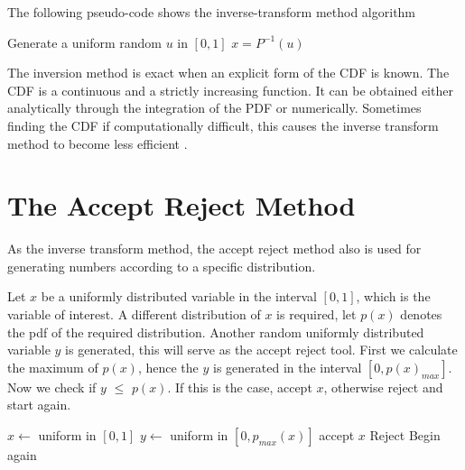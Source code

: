     
The following pseudo-code shows the inverse-transform method algorithm 
\begin{algorithmic}
\State Generate a uniform  random $u$ in $[0,1]$
\State \Return $x = P^{-1}(u)$
\end{algorithmic}

The inversion method is exact when an explicit form of the CDF is known. The CDF is a continuous and a strictly increasing function. It can be obtained either analytically through the integration of the PDF or numerically. Sometimes finding the CDF if computationally difficult, this causes the inverse transform method to become less efficient \citep{Devroye:1986:SNR:318242.318443}.

\section{The Accept Reject Method}
As the inverse transform method, the accept reject method also is used for generating numbers according to a specific distribution.

Let $x$ be a uniformly distributed variable in the interval $[0,1]$, which is the variable of interest. A different distribution of $x$ is required, let $p(x)$ denotes the pdf of the required distribution. Another  random uniformly distributed variable $y$ is generated, this will serve as the accept reject tool. First we calculate the maximum of $p(x)$, hence the $y$ is generated in the interval $[0,p(x)_{max}]$. Now we check if $y$ $\leq$ $p(x)$. If this is the case, accept $x$, otherwise reject and start again. 
\begin{algorithmic} 
\State $x \gets$ uniform in $[0, 1]$
\State $y \gets$ uniform in $[0, p_{max}(x)]$
    \State accept $x$
\Else 
	\State Reject 
\EndIf
\State Begin again
\end{algorithmic}
% 

 
